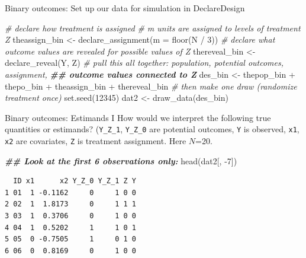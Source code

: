 \documentclass[
  ignorenonframetext,
]{beamer}
\newenvironment{Shaded}{\begin{snugshade}}{\end{snugshade}}
\newcommand{\AttributeTok}[1]{\textcolor[rgb]{0.77,0.63,0.00}{#1}}
\newcommand{\CommentTok}[1]{\textcolor[rgb]{0.56,0.35,0.01}{\textit{#1}}}
\newcommand{\DecValTok}[1]{\textcolor[rgb]{0.00,0.00,0.81}{#1}}
\newcommand{\DocumentationTok}[1]{\textcolor[rgb]{0.56,0.35,0.01}{\textbf{\textit{#1}}}}
\newcommand{\FunctionTok}[1]{\textcolor[rgb]{0.00,0.00,0.00}{#1}}
\newcommand{\NormalTok}[1]{#1}
\newcommand{\OtherTok}[1]{\textcolor[rgb]{0.56,0.35,0.01}{#1}}
\newcommand{\SpecialCharTok}[1]{\textcolor[rgb]{0.00,0.00,0.00}{#1}}
\begin{document}
\begin{frame}[fragile]{Binary outcomes: Set up our data for simulation
in DeclareDesign}
\protect\hypertarget{binary-outcomes-set-up-our-data-for-simulation-in-declaredesign-1}{}
\scriptsize

\begin{Shaded}
\begin{Highlighting}[]
\CommentTok{\# declare how treatment is assigned}
\CommentTok{\# m units are assigned to levels of treatment Z}
\NormalTok{theassign\_bin }\OtherTok{\textless{}{-}} \FunctionTok{declare\_assignment}\NormalTok{(}\AttributeTok{m =} \FunctionTok{floor}\NormalTok{(N }\SpecialCharTok{/} \DecValTok{3}\NormalTok{))}
\CommentTok{\# declare what outcome values are revealed for possible values of Z}
\NormalTok{thereveal\_bin }\OtherTok{\textless{}{-}} \FunctionTok{declare\_reveal}\NormalTok{(Y, Z)}
\CommentTok{\# pull this all together: population, potential outcomes, assignment,}
\DocumentationTok{\#\# outcome values connected to Z}
\NormalTok{des\_bin }\OtherTok{\textless{}{-}}\NormalTok{ thepop\_bin }\SpecialCharTok{+}\NormalTok{ thepo\_bin }\SpecialCharTok{+}\NormalTok{ theassign\_bin }\SpecialCharTok{+}\NormalTok{ thereveal\_bin}
\CommentTok{\# then make one draw (randomize treatment once)}
\FunctionTok{set.seed}\NormalTok{(}\DecValTok{12345}\NormalTok{)}
\NormalTok{dat2 }\OtherTok{\textless{}{-}} \FunctionTok{draw\_data}\NormalTok{(des\_bin)}
\end{Highlighting}
\end{Shaded}

\normalsize
\end{frame}

\begin{frame}[fragile]{Binary outcomes: Estimands I}
\protect\hypertarget{binary-outcomes-estimands-i}{}
How would we interpret the following true quantities or estimands?
(\texttt{Y\_Z\_1}, \texttt{Y\_Z\_0} are potential outcomes, \texttt{Y}
is observed, \texttt{x1}, \texttt{x2} are covariates, \texttt{Z} is
treatment assignment. Here \(N\)=20.

\scriptsize

\begin{Shaded}
\begin{Highlighting}[]
\DocumentationTok{\#\# Look at the first 6 observations only:}
\FunctionTok{head}\NormalTok{(dat2[, }\SpecialCharTok{{-}}\DecValTok{7}\NormalTok{])}
\end{Highlighting}
\end{Shaded}

\begin{verbatim}
  ID x1      x2 Y_Z_0 Y_Z_1 Z Y
1 01  1 -0.1162     0     1 0 0
2 02  1  1.8173     0     1 1 1
3 03  1  0.3706     0     1 0 0
4 04  1  0.5202     1     1 0 1
5 05  0 -0.7505     1     0 1 0
6 06  0  0.8169     0     1 0 0
\end{verbatim}

\normalsize
\end{frame}
\end{document}
